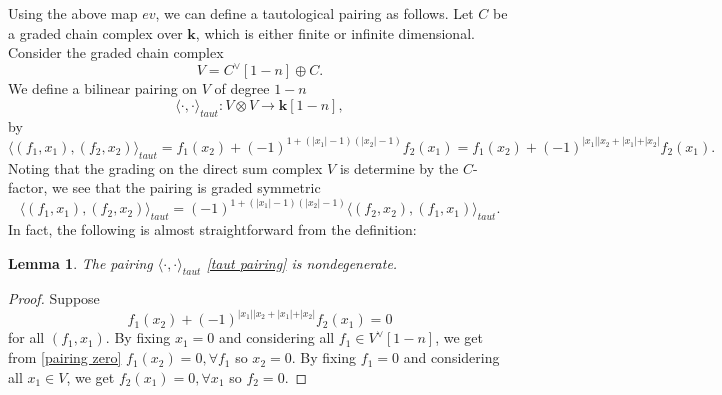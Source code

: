 \documentclass[11pt]{amsproc}
\def\K{{\mathbf{k}}}
\newtheorem{lem}{Lemma}[section]
\theoremstyle{remark}
\numberwithin{equation}{section}
\begin{document}
Using the above map $ev$,
we can define a tautological pairing as follows.
Let $C$ be a graded chain complex over $\K$,
which is either finite or infinite dimensional.
Consider the graded chain complex
\begin{equation}
V = C^{\vee}[1-n] \oplus C.
\end{equation}
We define a bilinear pairing on $V$ of degree $1-n$
\begin{equation}\label{taut pairing}
\langle \cdot, \cdot \rangle_{taut}: V \otimes V \to \K[1-n],
\end{equation}
by
\begin{equation}\label{taut pairing formula}
 \langle (f_{1}, x_{1}), (f_{2}, x_{2}) \rangle_{taut} =   f_{1}(x_{2}) + (-1)^{1+(|x_{1}|-1)(|x_{2}|-1)} f_{2}(x_{1}) =  f_{1}(x_{2}) + (-1)^{|x_{1}||x_{2} + |x_{1}| + |x_{2}|} f_{2}(x_{1}).
\end{equation}
Noting that the grading on the direct sum complex $V$ is determine by the $C$-factor, we see that the pairing is graded symmetric
\begin{equation}
 \langle (f_{1}, x_{1}), (f_{2}, x_{2}) \rangle_{taut} = (-1)^{1+(|x_{1}|-1)(|x_{2}|-1)}  \langle (f_{2}, x_{2}), (f_{1}, x_{1}) \rangle_{taut}.
\end{equation}
In fact, the following is almost straightforward from the definition:

\begin{lem}\label{lem: taut nondegenerate}
The pairing $\langle \cdot, \cdot \rangle_{taut}$ \eqref{taut pairing} is nondegenerate.
\end{lem}
\begin{proof}
Suppose 
\begin{equation}\label{pairing zero}
f_{1}(x_{2}) + (-1)^{|x_{1}||x_{2} + |x_{1}| + |x_{2}|}  f_{2}(x_{1}) = 0
\end{equation}
for all $(f_{1}, x_{1})$. 
By fixing $x_{1} = 0$ and considering all $f_{1} \in V^{\vee}[1-n]$, we get from \eqref{pairing zero} $f_{1}(x_{2}) = 0, \forall f_{1}$ so $x_{2} = 0$. 
By fixing $f_{1} = 0$ and considering all $x_{1} \in V$, we get $f_{2}(x_{1}) = 0, \forall x_{1}$ so $f_{2} = 0$.
\end{proof}
\end{document}
